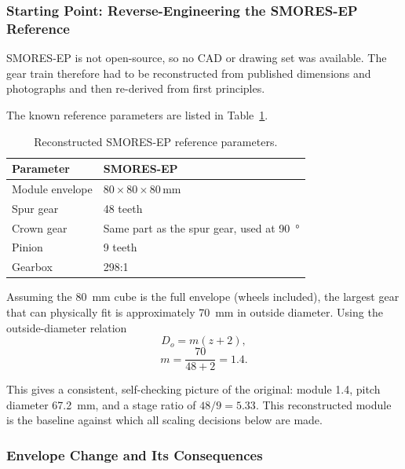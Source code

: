 \documentclass[12pt,a4paper]{article}
\begin{document}
\subsubsection{Starting Point: Reverse-Engineering the SMORES-EP Reference}

SMORES-EP is not open-source, so no CAD or drawing set was available. The gear
train therefore had to be reconstructed from published dimensions and
photographs and then re-derived from first principles.

The known reference parameters are listed in Table~\ref{tab:smores-ref}.

\begin{table}[htbp]
	\centering
	\caption{Reconstructed SMORES-EP reference parameters.}
	\label{tab:smores-ref}
	\begin{tabular}{ll}
		\toprule
		\textbf{Parameter} & \textbf{SMORES-EP} \\
		\midrule
		Module envelope & $80 \times 80 \times 80$\,mm \\
		Spur gear       & 48 teeth \\
		Crown gear      & Same part as the spur gear, used at \SI{90}{\degree} \\
		Pinion          & 9 teeth \\
		Gearbox         & 298:1 \\
		\bottomrule
	\end{tabular}
\end{table}

Assuming the \SI{80}{\milli\metre} cube is the full envelope (wheels included),
the largest gear that can physically fit is approximately \SI{70}{\milli\metre}
in outside diameter. Using the outside-diameter relation
\begin{equation}
	D_o = m(z + 2),
\end{equation}
\begin{equation}
	m = \frac{70}{48 + 2} = 1.4 .
\end{equation}

This gives a consistent, self-checking picture of the original: module
\num{1.4}, pitch diameter \SI{67.2}{\milli\metre}, and a stage ratio of
$48/9 = 5.33$. This reconstructed module is the baseline against which all
scaling decisions below are made.

\subsubsection{Envelope Change and Its Consequences}
\end{document}
